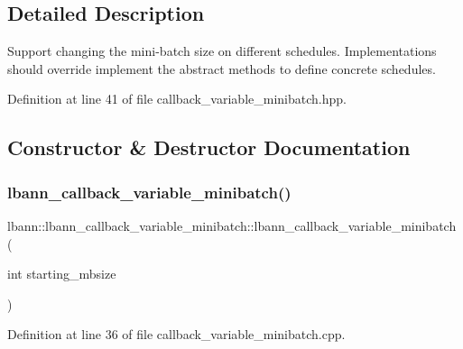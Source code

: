\subsection{Detailed Description}
Support changing the mini-\/batch size on different schedules. Implementations should override implement the abstract methods to define concrete schedules. 

Definition at line 41 of file callback\+\_\+variable\+\_\+minibatch.\+hpp.



\subsection{Constructor \& Destructor Documentation}
\mbox{\label{classlbann_1_1lbann__callback__variable__minibatch_a970a03f0d297f8447020e85d23f5ee73}} 
\subsubsection{\texorpdfstring{lbann\+\_\+callback\+\_\+variable\+\_\+minibatch()}{lbann\_callback\_variable\_minibatch()}\hspace{0.1cm}{\footnotesize\ttfamily [1/2]}}
{\footnotesize\ttfamily lbann\+::lbann\+\_\+callback\+\_\+variable\+\_\+minibatch\+::lbann\+\_\+callback\+\_\+variable\+\_\+minibatch (\begin{DoxyParamCaption}\item[{int}]{starting\+\_\+mbsize }\end{DoxyParamCaption})}



Definition at line 36 of file callback\+\_\+variable\+\_\+minibatch.\+cpp.



